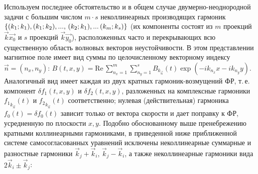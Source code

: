 Используем последнее обстоятельство и в общем случае двумерно-неоднородной задачи с большим числом $m \cdot s$ неколлинеарных производящих гармоник
$\{ (k_{1}; k_{1}),\,\\ (k_{1}; k_{2}),...,\, (k_{2}; k_{1}),...\, (k_{m}; k_{s}) \}$ (их компоненты состоят из $m$ проекций $\vec{k}\vec{x_0}$ и $s$ проекций $\vec{k}\vec{y_0}$), расположенных часто и перекрывающих всю существенную область волновых векторов неустойчивости. В этом представлении магнитное поле имеет вид суммы по целочисленному векторному индексу $\vec{n}=(n_x,n_y)$:
$B(t,x,y)= \mathrm{Re} \, \sum^{m}_{n_x=1}\sum_{n_y=1}^sB_{k_{\vec{n}}}(t)\exp(- ik_{n_{x}}x - ik_{n_{y}}y)$.
Аналогичный вид имеет каждая из двух кратных гармоник-возмущений ФР, т.\,е. компонент $\delta f_1(t,x,y)$ и $\delta f_2(t,x,y)$, разложенных на комплексные гармоники ${f_1}_{k_{\vec{n}}}(t)$ и ${f_2}_{k_{\vec{n}}}(t)$ соответственно; нулевая (действительная) гармоника $f_0(t)=\delta f_0(t)$ зависит только от вектора скорости и дает поправку к ФР, усредненную по плоскости $x,y$. Подобно обоснованному выше пренебрежению кратными коллинеарными гармониками, в приведенной ниже приближенной системе самосогласованных уравнений исключены неколлинеарные суммарные и разностные гармоники $\vec{k}_j+\vec{k}_i$, $\vec{k}_j-\vec{k}_i$, а также неколлинеарные гармоники вида $2\vec{k}_i\pm\vec{k}_j$:

